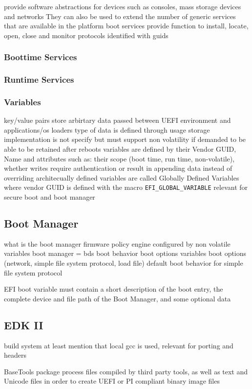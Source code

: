provide software abstractions for devices such as consoles, mass storage devices and networks
They can also be used to extend the number of generic services that are available in the platform
\cite[2.4 Protocols]{uefi-spec}
boot services provide function to install, locate, open, close and monitor protocols
\cite[7.3 Protocol Handler Services]{uefi-spec}
identified with guids
\subsubsection{Boottime Services}
\subsubsection{Runtime Services}
\subsubsection{Variables}
key/value pairs
store arbirtary data passed between UEFI environment and applications/os loaders
type of data is defined through usage
storage implementation is not specify but must support non volatility if demanded to be able to be retained after reboots
variables are defined by their Vendor GUID, Name and attributes such as: their scope (boot time, run time, non-volatile), whether writes require authentication or result in appending data instead of overriding
\cite[8.2]{uefi-spec}
architecually defined variables are called Globally Defined Variables where vendor GUID is defined with the macro \lstinline{EFI_GLOBAL_VARIABLE}
\cite[3.3]{uefi-spec}
relevant for secure boot and boot manager

\subsection{Boot Manager}
what is the boot manager
firmware policy engine
configured by non volatile variables
\cite[3.1]{uefi-spec}
boot manager = bds
boot behavior
boot options variables
boot options (network, simple file system protocol, load file)
default boot behavior for simple file system protocol

EFI boot variable must contain a short description of the boot entry, the complete
device and file path of the Boot Manager, and some optional data
\cite{windows-internals-7-part2}


\subsection{EDK II}
build system
at least mention that local gcc is used, relevant for porting and headers

BaseTools package process files compiled by third party tools, as well as text and Unicode files in order to create UEFI or PI compliant binary image files
\cite{tianocore-edk2}
